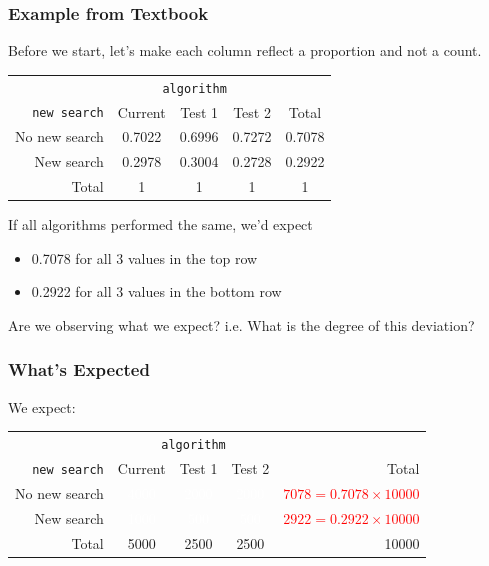 \documentclass[handout]{beamer}
\newcommand{\blue}[1]{\textcolor{blue2}{#1}}
\newcommand{\white}[1]{\textcolor{white}{#1}}
\newcommand{\red}[1]{\textcolor{red}{#1}}
\begin{document}
\begin{frame}
\frametitle{Example from Textbook}

Before we start, let's make each column reflect a proportion and not a count. \pause
\begin{center}
  \begin{tabular}{r|ccc|c}
& \multicolumn{3}{c|}{{\tt algorithm}} & \\
       {\tt new search} & Current & Test 1 & Test 2 & Total \\ 
\hline
    No new search & 0.7022 & 0.6996 & 0.7272 & 0.7078 \\ 
    New search & 0.2978 & 0.3004 & 0.2728 & 0.2922 \\ 
\hline
    Total & 1 & 1 & 1 & 1 \\ 
  \end{tabular}
\end{center}

\pause
If all algorithms performed the same, we'd \blue{expect}
\begin{itemize}
\item \blue{0.7078} for all 3 values in the top row
\item \blue{0.2922} for all 3 values in the bottom row
\end{itemize}

\pause Are we observing what we expect? i.e. What is the degree of this deviation?
\end{frame}


\begin{frame}
\frametitle{What's Expected}

We expect:
\begin{center}
  \begin{tabular}{r|ccc|r}
& \multicolumn{3}{c|}{{\tt algorithm}} & \\
       {\tt new search} & Current & Test 1 & Test 2 & Total \\ 
\hline
    No new search & \white{4000} & \white{2000} & \white{2000} & \red{$7078 = 0.7078 \times 10000$} \\ 
    New search & \white{1000} & \white{500} & \white{500} & \red{$2922 = 0.2922 \times 10000$} \\ 
\hline
    Total & 5000 & 2500 & 2500 & 10000 \\ 
  \end{tabular}
\end{center}


\end{frame}
\end{document}
